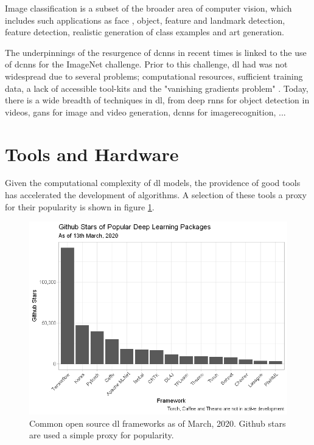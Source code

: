 Image classification is a subset of the broader area of computer vision, which includes such applications as face , object, feature and landmark detection, feature detection, realistic  generation of class examples and art generation.  
\bigskip

The underpinnings of the resurgence of \gls{dcnn}s in recent times is linked to the use of \gls{dcnn}s for the ImageNet challenge. Prior to this challenge, \gls{dl} had was not widespread due to several problems; computational resources, sufficient training data, a lack of accessible tool-kits and the "vanishing gradients problem" \cite[Chapter~8]{good_fellow_2016} \cite[p.~93-94]{dl_overview}. Today, there is a wide breadth of techniques in \gls{dl}, from deep \gls{rnn}s for object detection in videos, \gls{gan}s for image and video generation, \gls{dcnn}s for \gls{imagerecognition}, ... 


\section{Tools and Hardware}

Given the computational complexity of  \gls{dl} models, the providence of good tools has accelerated the development of algorithms. A selection of these tools a proxy for their popularity is shown in figure \ref{fig:git_stars}.

\begin{figure}
    \centering
    \includegraphics[width=120mm]{figs/gitstars.png}
    \caption[Popular \gls{dl} frameworks]{Common open source \gls{dl} frameworks as of March, 2020. Github stars are used a simple proxy for popularity.}
    \label{fig:git_stars}
\end{figure}

